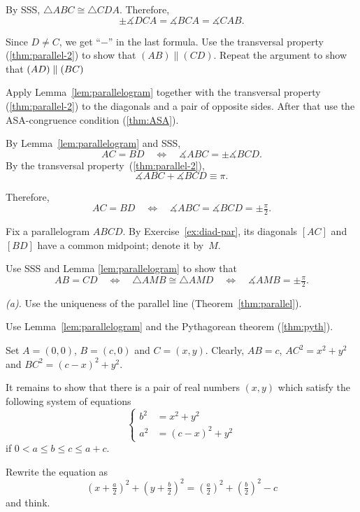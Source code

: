 By SSS, $\triangle ABC\cong \triangle CDA$.
Therefore, 
$$\pm\measuredangle DCA= \measuredangle BCA=\measuredangle CAB.$$

Since $D\ne C$, we get ``$-$'' in the last formula.
Use the transversal property (\ref{thm:parallel-2}) to show that $(AB)\parallel (CD)$. Repeat the argument to show that $(AD)\z\parallel(BC)$ 

Apply Lemma~\ref{lem:parallelogram} together with
the transversal property (\ref{thm:parallel-2}) to the diagonals and a pair of opposite sides.
After that use the ASA-congruence condition (\ref{thm:ASA}).

By Lemma~\ref{lem:parallelogram} and SSS, 
\[AC=BD
\quad
\iff
\quad
\measuredangle ABC=\pm \measuredangle BCD.\]
By the transversal property~(\ref{thm:parallel-2}), 
\[\measuredangle ABC+\measuredangle BCD\equiv \pi.\]

Therefore, 
\[AC=BD
\quad
\iff
\quad 
\measuredangle ABC
=\measuredangle BCD
=\pm\tfrac\pi2.\]

Fix a parallelogram $ABCD$.
By Exercise~\ref{ex:diad-par},
its diagonals $[AC]$ and $[BD]$ have a common midpoint; denote it by~$M$.

Use SSS and Lemma \ref{lem:parallelogram} to show that
\[AB=CD
\quad
\iff
\quad
\triangle AMB
\cong
\triangle AMD
\quad
\iff
\quad
\measuredangle AMB
=
\pm\tfrac\pi2.\]

 \textit{(a).} Use the uniqueness of the parallel line (Theorem~\ref{thm:parallel}).

 Use Lemma~\ref{lem:parallelogram} and the Pythagorean theorem (\ref{thm:pyth}).

Set $A=(0,0)$, $B=(c,0)$ and $C=(x,y)$.
Clearly, $AB=c$,
$AC^2=x^2+y^2$ and $BC^2=(c-x)^2+y^2$.

It remains to show that there is a pair of real numbers $(x,y)$ 
which satisfy the following system of equations 
$$
\left\{
\begin{aligned}
b^2&=x^2+y^2
\\
a^2&=(c-x)^2+y^2
\end{aligned}
\right.
$$
if $0<a\le b\le c\le a+c$.




 Rewrite the equation as 
\[(x+\tfrac a2)^2+(y+\tfrac b2)^2=(\tfrac a2)^2+(\tfrac b2)^2-c\]
and think.

